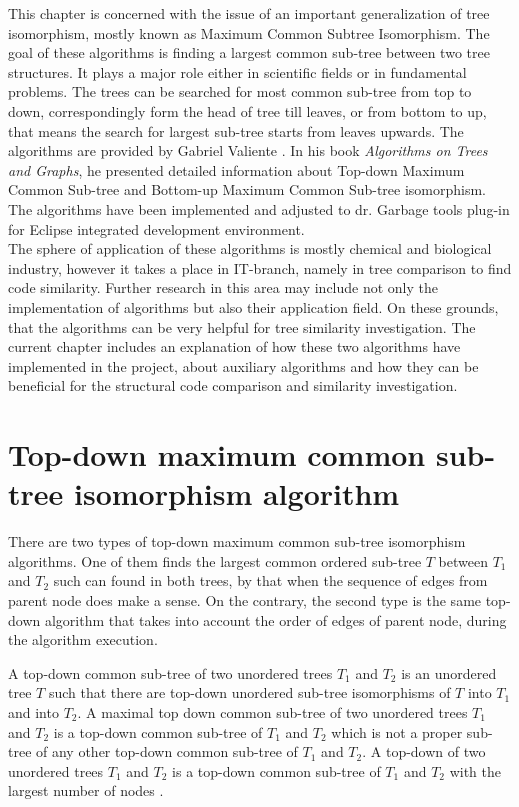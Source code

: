 \documentclass{report}
\begin{document}
This chapter is concerned with the issue of an important generalization of tree isomorphism, mostly known as Maximum Common Subtree Isomorphism. The goal of these algorithms is finding a largest common sub-tree between two tree structures. It plays a major role either in scientific fields or in fundamental problems. The trees can be searched for most common sub-tree from top to down, correspondingly form the head of tree till leaves, or from bottom to up, that means the search for largest sub-tree starts from leaves upwards. The algorithms are provided by Gabriel Valiente \cite{valiente}. In his book \emph{Algorithms on Trees and Graphs}, he presented detailed information about Top-down Maximum Common Sub-tree and Bottom-up Maximum Common Sub-tree isomorphism. The algorithms have been implemented and adjusted to dr. Garbage tools plug-in for Eclipse integrated development environment.
\\
The sphere of application of these algorithms is mostly chemical and biological industry, however it takes a place in IT-branch, namely in tree comparison to find code similarity. Further research in this area may include not only the implementation of algorithms but also their application field. On these grounds, that the algorithms can be very helpful for tree similarity investigation. The current chapter includes an explanation of how these two algorithms have implemented in the project, about auxiliary algorithms and how they can be beneficial for the structural code comparison and similarity investigation.

\section{Top-down maximum common sub-tree isomorphism algorithm}
\label{sec:topdown}

There are two types of top-down maximum common sub-tree isomorphism algorithms. One of them finds the largest common ordered sub-tree $T$ between $ T_{1}$ and $ T_{2}$ such can found in both trees, by that when the sequence of edges from parent node does make a sense. On the contrary, the second type is the same top-down algorithm that takes into account the order of edges of parent node, during the algorithm execution. 

A top-down common sub-tree of two unordered trees $ T_{1}$ and $ T_{2 }$ is an unordered tree $T$ such that there are top-down unordered sub-tree isomorphisms of $ T$ into $ T_{1}$ and into $ T_{2}$. A maximal top down common sub-tree of two unordered  trees $ T_{1}$ and $ T_{2}$ is a top-down common sub-tree of $ T_{1}$ and $ T_{2}$ which is not a proper sub-tree of any other top-down common sub-tree of $ T_{1}$ and $ T_{2}$. A top-down of two unordered trees $ T_{1}$ and $ T_{2}$ is a top-down common sub-tree of $ T_{1}$ and $ T_{2}$ with the largest number of nodes \cite{valiente}.
\end{document}
